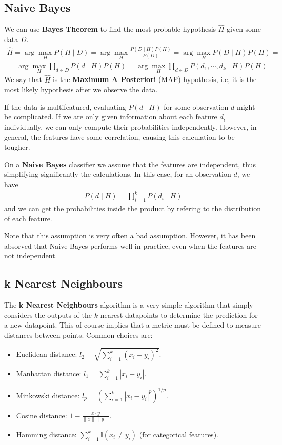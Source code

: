 \documentclass{article}
\begin{document}
\subsection{Naive Bayes}

We can use \textbf{Bayes Theorem} to find the most probable hypothesis $\hat{H}$ given some data $D$.
\begin{gather*}
\hat{H} = \arg \max_{H} P(H \mid D) = \arg \max_{H} \frac{P(D \mid H)P(H)}{P(D)} = \arg \max_{H} P(D \mid H)P(H) = \\
= \arg \max_{H} \prod_{d \in D} P(d \mid H)P(H) = \arg \max_{H} \prod_{d \in D} P(d_1, \cdots, d_k \mid H)P(H)
\end{gather*}
We say that $\hat{H}$ is the \textbf{Maximum A Posteriori} (MAP) hypothesis, i.e, it is the most likely hypothesis after we observe the data.

If the data is multifeatured, evaluating $P(d \mid H)$ for some observation $d$ might be complicated.
If we are only given information about each feature $d_i$ individually, we can only compute their probabilities independently.
However, in general, the features have some correlation, causing this calculation to be tougher.

On a \textbf{Naive Bayes} classifier we assume that the features are independent, thus simplifying significantly the calculations.
In this case, for an observation $d$, we have
\begin{gather*}
P(d \mid H) = \prod_{i=1}^k P(d_i \mid H)
\end{gather*}
and we can get the probabilities inside the product by refering to the distribution of each feature.

Note that this assumption is very often a bad assumption.
However, it has been absorved that Naive Bayes performs well in practice, even when the features are not independent.

\subsection{k Nearest Neighbours}

The \textbf{k Nearest Neighbours} algorithm is a very simple algorithm that simply considers the outputs of the $k$ nearest datapoints to determine the prediction for a new datapoint.
This of course implies that a metric must be defined to measure distances between points.
Common choices are:
\begin{itemize}
\item Euclidean distance: $l_2 = \sqrt{\sum_{i=1}^k (x_i-y_i)^2}$.
\item Manhattan distance: $l_1 = \sum_{i=1}^k |x_i-y_i|$.
\item Minkowski distance: $l_p = \left(\sum_{i=1}^k |x_i-y_i|^p\right)^{1/p}$.
\item Cosine distance: $1-\frac{x \cdot y}{\|x\| \|y\|}$.
\item Hamming distance: $\sum_{i=1}^k \mathbb{I}(x_i \neq y_i)$ (for categorical features).
\end{itemize}
\end{document}
